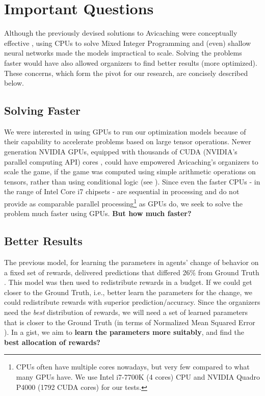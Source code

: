 \section{Important Questions} \label{sec:Important Questions}
Although the previously devised solutions to Avicaching were conceptually effective \cite{Xue2016Avi1, Xue2016Avi2}, using CPUs to solve Mixed Integer Programming and (even) shallow neural networks made the models impractical to scale. Solving the problems faster would have also allowed organizers to find better results (more optimized). These concerns, which form the pivot for our research, are concisely described below.

\subsection{Solving Faster} \label{sec:Important Questions - Solving Faster}
We were interested in using GPUs to run our optimization models because of their capability to accelerate problems based on large tensor operations. Newer generation NVIDIA GPUs, equipped with thousands of CUDA (NVIDIA's parallel computing API) cores \cite{NVIDIA}, could have empowered Avicaching's organizers to scale the game, if the game was computed using simple arithmetic operations on tensors, rather than using conditional logic (see ). Since even the faster CPUs - in the range of Intel Core i7 chipsets - are sequential in processing and do not provide as comparable parallel processing\footnote{CPUs often have multiple cores nowadays, but very few compared to what many GPUs have. We use Intel i7-7700K (4 cores) CPU and NVIDIA Quadro P4000 (1792 CUDA cores) for our tests.} as GPUs do, we seek to solve the problem much faster using GPUs. \textbf{But how much faster?}

\subsection{Better Results} \label{sec:Important Questions - Better Results}
The previous model, for learning the parameters in agents' change of behavior on a fixed set of rewards, delivered predictions that differed 26\% from Ground Truth \cite[Table 1]{Xue2016Avi2}. This model was then used to redistribute rewards in a budget. If we could get closer to the Ground Truth, i.e., better learn the parameters for the change, we could redistribute rewards with superior prediction/accuracy. Since the organizers need the \textit{best} distribution of rewards, we will need a set of learned parameters that is closer to the Ground Truth (in terms of Normalized Mean Squared Error \cite[Section 4.2]{Xue2016Avi2}). In a gist, we aim to \textbf{learn the parameters more suitably}, and find the \textbf{best allocation of rewards?}

